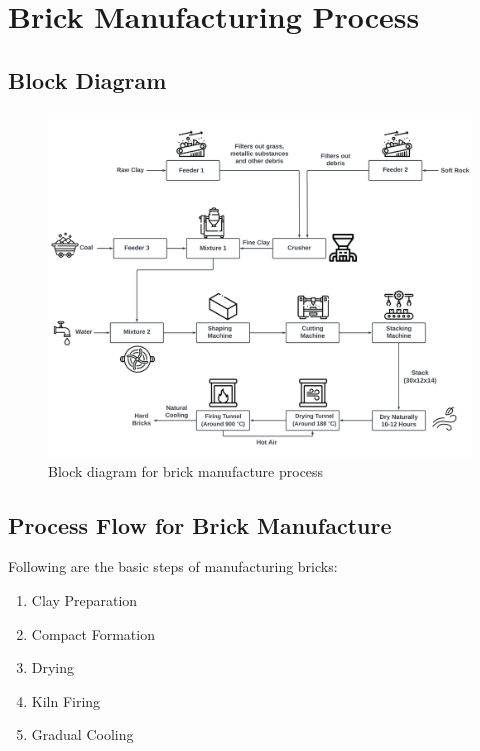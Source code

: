 \section{Brick Manufacturing Process}

\subsection{Block Diagram}
\begin{figure}[h]
  \centering
  \includegraphics[width=1\textwidth]{img/block diagram.png}
  \caption{Block diagram for brick manufacture process}
\end{figure}

\subsection{Process Flow for Brick Manufacture}
Following are the basic steps of manufacturing bricks:
\begin{enumerate}
\item Clay Preparation
\item Compact Formation
\item Drying
\item Kiln Firing
\item Gradual Cooling
\end{enumerate}

\newpage

